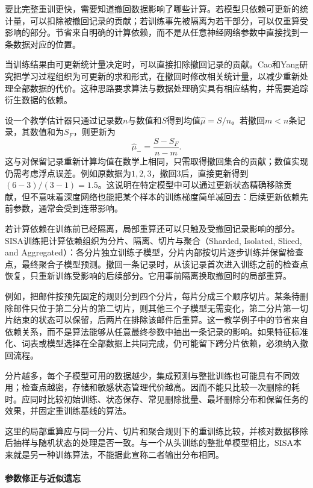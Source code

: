 要比完整重训更快，需要知道撤回数据影响了哪些计算。若模型只依赖可更新的统计量，可以扣除被撤回记录的贡献；若训练事先被隔离为若干部分，可以仅重算受影响的部分。节省来自明确的计算依赖，而不是从任意神经网络参数中直接找到一条数据对应的位置。

当训练结果由可更新统计量决定时，可以直接扣除撤回记录的贡献。Cao和Yang研究把学习过程组织为可更新的求和形式，在撤回时修改相关统计量，以减少重新处理全部数据的代价。这种思路要求算法与数据处理确实具有相应结构，并需要追踪衍生数据的依赖。

设一个教学估计器只通过记录数$n$与数值和$S$得到均值$\hat\mu=S/n$。若撤回$m<n$条记录，其数值和为$S_F$，则更新为
\[
 \hat\mu_- =\frac{S-S_F}{n-m}.
\]
这与对保留记录重新计算均值在数学上相同，只需取得撤回集合的贡献；数值实现仍需考虑浮点误差。例如原数据为$1,2,3$，撤回3后，直接更新得到$(6-3)/(3-1)=1.5$。这说明在特定模型中可以通过更新状态精确移除贡献，但不意味着深度网络也能把某个样本的训练梯度简单减回去：后续更新依赖先前参数，通常会受到连带影响。

若计算依赖在训练前已经隔离，局部重算还可以只触及受撤回记录影响的部分。SISA训练把计算依赖组织为分片、隔离、切片与聚合（Sharded, Isolated, Sliced, and Aggregated）：各分片独立训练子模型，分片内部按切片逐步训练并保留检查点，最终聚合子模型预测。撤回一条记录时，从该记录首次进入训练之前的检查点恢复，只重新训练受影响的后续部分。它用事前隔离换取撤回时的局部重算。

例如，把邮件按预先固定的规则分到四个分片，每片分成三个顺序切片。某条待删除邮件只位于第二分片的第二切片，则其他三个子模型无需变化，第二分片第一切片结束的状态可以保留，后两片在排除该邮件后重算。这一教学例子中的节省来自依赖关系，而不是算法能够从任意最终参数中抽出一条记录的影响。如果特征标准化、词表或模型选择在全部数据上共同完成，仍可能留下跨分片依赖，必须纳入撤回流程。

分片越多，每个子模型可用的数据越少，集成预测与整批训练也可能具有不同效用；检查点越密，存储和敏感状态管理代价越高。因而不能只比较一次删除的耗时。应同时比较初始训练、状态保存、常见删除批量、最坏删除分布和保留任务的效果，并固定重训练基线的算法。

这里的局部重算应与同一分片、切片和聚合规则下的重训练比较，并核对数据移除后抽样与随机状态的处理是否一致。与一个从头训练的整批单模型相比，SISA本来就是另一种训练算法，不能据此宣称二者输出分布相同。

\paragraph{参数修正与近似遗忘}

